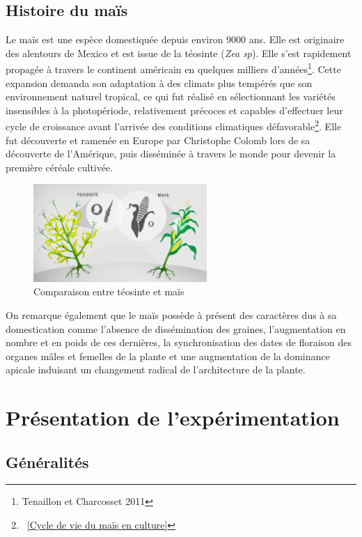 \documentclass[12pt,a4paper]{report}
\begin{document}
			\subsection{Histoire du maïs}
				Le maïs est une espèce domestiquée depuis environ 9000 ans. Elle est originaire des alentours de Mexico et est issue de la téosinte (\textit{Zea sp}). Elle s'est rapidement propagée à travers le continent américain\cite{tenaillon} en quelques milliers d'années\footnote{Tenaillon et Charcosset 2011}. Cette expansion demanda son adaptation à des climats plus tempérés que son environnement naturel tropical, ce qui fut réalisé en sélectionnant les variétés insensibles à la photopériode, relativement précoces et capables d'effectuer leur cycle de croissance avant l'arrivée des conditions climatiques défavorable\footnote{~\ref{Cycle de vie du maïs en culture}}. Elle fut découverte et ramenée en Europe par Christophe Colomb lors de sa découverte de l'Amérique, puis disséminée à travers le monde pour devenir la première céréale cultivée.
				\begin{figure}
					\includegraphics[width=6.6cm]{comparaison.jpg}
					\caption{Comparaison entre téosinte et maïs}
					\label{Comparaison entre téosinte et maïs}
				\end{figure}
				On remarque également que le maïs possède à présent des caractères dus à sa domestication comme l'absence de dissémination des graines, l'augmentation en nombre et en poids de ces dernières, la synchronisation des dates de floraison des organes mâles et femelles de la plante et une augmentation de la dominance apicale induisant un changement radical de l'architecture de la plante.
				
		\section{Présentation de l'expérimentation}
		
			\subsection{Généralités}
				
\end{document}
